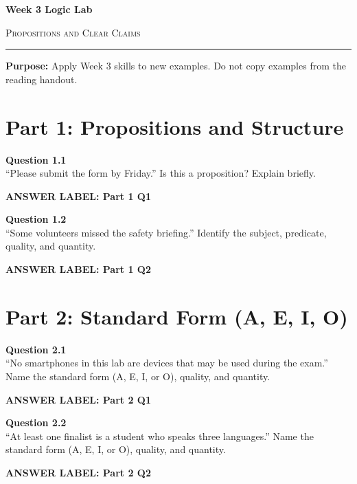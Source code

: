 \documentclass[12pt]{article}
\newcommand{\answerbox}[2]{%
\vspace{0.15em}
\noindent\textbf{#1}\par
\vspace{0.05em}
\noindent\fbox{%
\begin{minipage}[t][#2]{\dimexpr\textwidth-2\fboxsep-2\fboxrule}
\rule{\textwidth}{0pt}
\vspace{#2}
\end{minipage}
}\par
\vspace{0.25em}
}
\begin{document}
\begin{center}
{\LARGE\bfseries Week 3 Logic Lab}\par\vspace{0.05em}
{\large\scshape Propositions and Clear Claims}\par\vspace{0.1em}
\rule{0.78\textwidth}{0.5pt}\par\vspace{0.15em}
\end{center}

\noindent\textbf{Purpose:} Apply Week 3 skills to new examples. Do not copy examples from the reading handout.

\vspace{0.3em}

\section*{Part 1: Propositions and Structure}

\textbf{Question 1.1}\\[-0.15em]
``Please submit the form by Friday.'' Is this a proposition? Explain briefly.

\answerbox{ANSWER LABEL: Part 1 Q1}{1.45in}

\textbf{Question 1.2}\\[-0.15em]
``Some volunteers missed the safety briefing.'' Identify the subject, predicate, quality, and quantity.

\answerbox{ANSWER LABEL: Part 1 Q2}{1.75in}

\newpage

\section*{Part 2: Standard Form (A, E, I, O)}

\textbf{Question 2.1}\\[-0.15em]
``No smartphones in this lab are devices that may be used during the exam.'' Name the standard form (A, E, I, or O), quality, and quantity.

\answerbox{ANSWER LABEL: Part 2 Q1}{1.65in}

\textbf{Question 2.2}\\[-0.15em]
``At least one finalist is a student who speaks three languages.'' Name the standard form (A, E, I, or O), quality, and quantity.

\answerbox{ANSWER LABEL: Part 2 Q2}{1.65in}

\newpage
\end{document}
